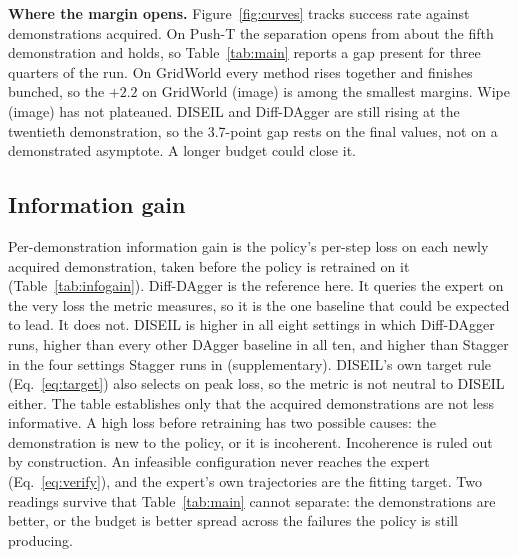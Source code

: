 \noindent\textbf{Where the margin opens.}
Figure~\ref{fig:curves} tracks success rate against demonstrations acquired. On
Push-T the separation opens from about the fifth demonstration and holds, so
Table~\ref{tab:main} reports a gap present for three quarters of the run. On
GridWorld every method rises together and finishes bunched, so the $+2.2$ on
GridWorld (image) is among the smallest margins. Wipe (image) has not plateaued.
DISEIL and Diff-DAgger are still rising at the twentieth demonstration, so the
3.7-point gap rests on the final values, not on a demonstrated asymptote. A
longer budget could close it.

\subsection{Information gain}

Per-demonstration information gain is the policy's per-step loss on each newly
acquired demonstration, taken before the policy is retrained on it
(Table~\ref{tab:infogain}). Diff-DAgger is the reference here. It queries the
expert on the very loss the metric measures, so it is the one baseline that could
be expected to lead. It does not. DISEIL is higher in all eight settings in which
Diff-DAgger runs, higher than every other DAgger baseline in all ten, and higher
than Stagger in the four settings Stagger runs in (supplementary). DISEIL's own target
rule (Eq.~\ref{eq:target}) also selects on peak loss, so the metric is not neutral
to DISEIL either. The table establishes only that the acquired demonstrations are
not less informative. A high loss before retraining has two possible causes: the
demonstration is new to the policy, or it is incoherent. Incoherence is ruled out
by construction. An infeasible configuration never reaches the expert
(Eq.~\ref{eq:verify}), and the expert's own trajectories are the fitting target.
Two
readings survive that Table~\ref{tab:main} cannot separate: the demonstrations are
better, or the budget is better spread across the failures the policy is still
producing.
